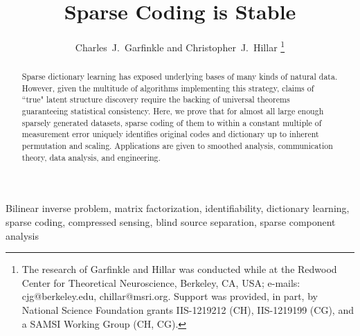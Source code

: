 \documentclass[journal, twocolumn]{IEEEtran}
\begin{document}
\title{Sparse Coding is Stable}

\author{Charles~J.~Garfinkle and Christopher~J.~Hillar
\thanks{The research of Garfinkle and Hillar was conducted while at the Redwood Center for Theoretical Neuroscience, Berkeley, CA, USA; e-mails: cjg@berkeley.edu, chillar@msri.org.  Support was provided, in part, by National Science Foundation grants IIS-1219212 (CH), IIS-1219199 (CG), and a SAMSI Working Group (CH, CG).}}

\maketitle

\begin{abstract}
Sparse dictionary learning has exposed underlying bases of many kinds of natural data.  However, given the multitude of algorithms implementing this strategy, claims of ``true" latent structure discovery require the backing of universal theorems guaranteeing statistical consistency.  Here, we prove that for almost all large enough sparsely generated datasets, sparse coding of them to within a constant multiple of measurement error uniquely identifies original codes and dictionary up to inherent permutation and scaling.  Applications are given to smoothed analysis, communication theory, data analysis, and engineering.
\end{abstract}

\begin{IEEEkeywords}
Bilinear inverse problem, matrix factorization, identifiability, dictionary learning, sparse coding, compressed sensing, blind source separation, sparse component analysis
\end{IEEEkeywords}
\end{document}
